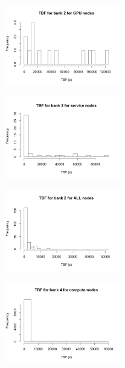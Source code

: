 \begin{t able}[t]
\begin{figure}
\centering
\includegraphics[width=0.45\textwidth]{images/tbf_2_g.png}
\end{figure}

\begin{figure}
\centering
\includegraphics[width=0.45\textwidth]{images/tbf_2_s.png}
\end{figure}

\begin{figure}
\centering
\includegraphics[width=0.45\textwidth]{images/tbf_2_a.png}
\end{figure}

\begin{figure}
\centering
\includegraphics[width=0.45\textwidth]{images/tbf_4_c.png}
\end{figure}


\end{t able}
